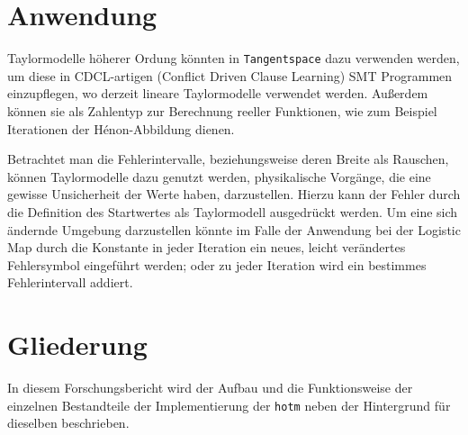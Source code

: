 \section{Anwendung}

Taylormodelle höherer Ordung könnten in \verb+Tangentspace+ dazu verwenden werden, um diese in CDCL-artigen (Conflict Driven Clause Learning) SMT Programmen einzupflegen, wo derzeit lineare Taylormodelle verwendet werden. Außerdem können sie als Zahlentyp zur Berechnung reeller Funktionen, wie zum Beispiel Iterationen der Hénon-Abbildung dienen. \par
Betrachtet man die Fehlerintervalle, beziehungsweise deren Breite als Rauschen, können Taylormodelle dazu genutzt werden, physikalische Vorgänge, die eine gewisse Unsicherheit der Werte haben, darzustellen. Hierzu kann der Fehler durch die Definition des Startwertes als Taylormodell ausgedrückt werden. Um eine sich ändernde Umgebung darzustellen könnte im Falle der Anwendung bei der Logistic Map durch die Konstante in jeder Iteration ein neues, leicht verändertes Fehlersymbol eingeführt werden; oder zu jeder Iteration wird ein bestimmes Fehlerintervall addiert.



\section{Gliederung}
\label{ch:Einleitung:sec:Gliederung}

In diesem Forschungsbericht wird der Aufbau und die Funktionsweise der einzelnen Bestandteile der Implementierung der \verb+hotm+ neben der Hintergrund für dieselben beschrieben. 




